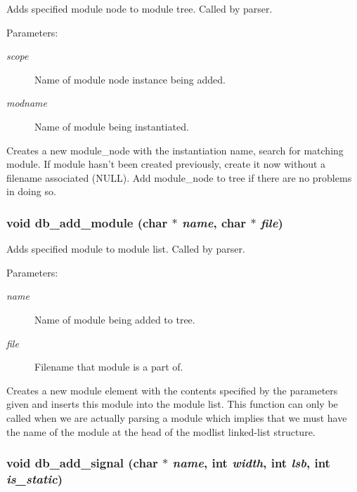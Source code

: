 Adds specified module node to module tree. Called by parser.

\begin{Desc}
\item[Parameters: ]\par
\begin{description}
\item[{\em 
scope}]Name of module node instance being added. \item[{\em 
modname}]Name of module being instantiated.\end{description}
\end{Desc}
Creates a new module\_\-node with the instantiation name, search for matching module. If module hasn't been created previously, create it now without a filename associated (NULL). Add module\_\-node to tree if there are no problems in doing so. 
\subsubsection{\setlength{\rightskip}{0pt plus 5cm}void db\_\-add\_\-module (char $\ast$ {\em name}, char $\ast$ {\em file})}\label{db_8h_a3}


Adds specified module to module list. Called by parser.

\begin{Desc}
\item[Parameters: ]\par
\begin{description}
\item[{\em 
name}]Name of module being added to tree. \item[{\em 
file}]Filename that module is a part of.\end{description}
\end{Desc}
Creates a new module element with the contents specified by the parameters given and inserts this module into the module list. This function can only be called when we are actually parsing a module which implies that we must have the name of the module at the head of the modlist linked-list structure. 
\subsubsection{\setlength{\rightskip}{0pt plus 5cm}void db\_\-add\_\-signal (char $\ast$ {\em name}, int {\em width}, int {\em lsb}, int {\em is\_\-static})}\label{db_8h_a4}


